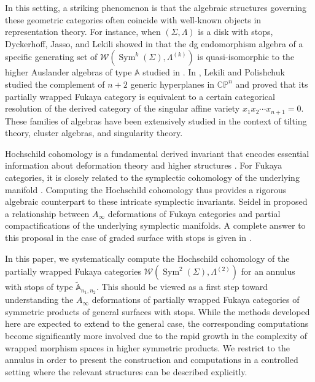\documentclass[a4paper, reqno, 11pt]{amsart}
\theoremstyle{definition}
\begin{document}
	In this setting, a striking phenomenon is that the algebraic structures governing these geometric categories often coincide with well-known objects in representation theory. For instance, when $(\Sigma, \Lambda)$ is a disk with stops, Dyckerhoff, Jasso, and Lekili showed in \cite{Dyckerhoff-Jasso-Lekili2021} that the dg endomorphism algebra of a specific generating set of $\mathcal{W}(\operatorname{Sym}^k(\Sigma), \Lambda^{(k)})$ is quasi-isomorphic to the higher Auslander algebras of type $\mathbb{A}$ studied in \cite{Iyama2007}. In \cite{Lekili-Polishchuk2020b}, Lekili and Polishchuk studied the complement of $n+2$ generic hyperplanes in $\mathbb{CP}^n$ and proved that its partially wrapped Fukaya category is equivalent to a certain categorical resolution of the derived category of the singular affine variety $x_1x_2\cdots x_{n+1}=0$. These families of algebras have been extensively studied in the context of tilting theory, cluster algebras, and singularity theory.
	
	Hochschild cohomology is a fundamental derived invariant that encodes essential information about deformation theory and higher structures \cite{Gerstenhaber1964, Keller1998}. For Fukaya categories, it is closely related to the symplectic cohomology of the underlying manifold \cite{Seidel2008, Ganatra2012, Smith2026}. Computing the Hochschild cohomology thus provides a rigorous algebraic counterpart to these intricate symplectic invariants. Seidel in \cite{Seidel2002} proposed a relationship between $A_\infty$ deformations of Fukaya categories and partial compactifications of the underlying symplectic manifolds. A complete answer to this proposal in the case of graded surface with stops is given in \cite{Barmeier-Schroll-Wang2025}.
	
	In this paper, we systematically compute the Hochschild cohomology of the partially wrapped Fukaya categories $\mathcal{W}(\operatorname{Sym}^2(\Sigma), \Lambda^{(2)})$ for an annulus with stops of type
	\(\widetilde{\mathbb A}_{n_1,n_2}\). This should be viewed as a first step toward understanding the $A_\infty$ deformations of partially wrapped Fukaya categories of symmetric products of general surfaces with stops. While the methods developed here are expected to extend to the general case, the corresponding computations become significantly more involved due to the rapid growth in the complexity of wrapped morphism spaces in higher symmetric products. We restrict to the annulus in order to present the construction and computations in a controlled setting where the relevant structures can be described explicitly.
	
\end{document}
